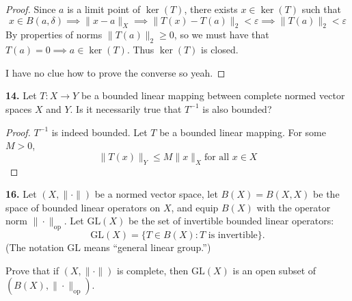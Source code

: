 \documentclass{article}
\newcommand{\op}{\mathrm{op}}
\newcommand{\GL}{\mathrm{GL}}
\theoremstyle{plain} %
\numberwithin{thm}{section} %
\theoremstyle{definition}
\begin{document}
\begin{enumerate}[label=(\alph*)]
\begin{proof}
            Since \(a\) is a limit point of \(\ker (T)\), there exists \(x \in \ker (T)\) such that
            \[
                x \in B(a, \delta) \implies \|x -a\| _X \implies \|T(x)-T(a)\| _2 < \varepsilon \implies \|T(a)\| _2 < \varepsilon
            \]
            By properties of norms \(\|T(a)\| _2 \geq 0\), so we must have that \(T(a) = 0 \implies a \in \ker (T)\). Thus \(\ker(T)\) is closed.

            I have no clue how to prove the converse so yeah.

        \end{proof}
    \end{enumerate}
    \pagebreak
    \noindent\textbf{14.} Let $T:X\rightarrow Y$ be a bounded linear mapping between complete normed vector spaces $X$ and $Y$. Is it necessarily true that $T^{-1}$ is also bounded?
    \begin{proof}
        \(T^{-1}\) is indeed bounded. Let \(T\) be a bounded linear mapping. For some \(M >0\),
        \[
            \|T(x)\|_Y \leq M\|x\|_X \text{for all } x \in X
        \]
    \end{proof}
    \pagebreak
    \noindent\textbf{16.} Let $(X,\|\cdot\|)$ be a normed vector space, let $B(X)=B(X,X)$ be the space of bounded linear operators on $X$, and equip $B(X)$ with the operator norm $\|\cdot\|_{\op}$. Let $\GL(X)$ be the set of invertible bounded linear operators:
        \[ \GL(X) = \{T\in B(X) : \text{$T$ is invertible}\}. \]
    (The notation $\GL$ means ``general linear group.'')
    
    Prove that if $(X,\|\cdot\|)$ is complete, then $\GL(X)$ is an open subset of $(B(X),\|\cdot\|_{\mathrm{op}})$.
    
\end{document}
